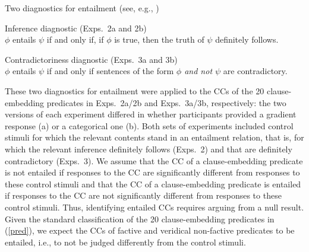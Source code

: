 \documentclass[11pt,fleqn]{article}
\newcommand{\6}{\mbox{$[\hspace*{-.6mm}[$}}
\newcommand{\9}{\mbox{$]\hspace*{-.6mm}]$}}
\begin{document}
\begin{exe}
\ex\label{diag} Two diagnostics for entailment \hfill (see, e.g., \citealt[\S3.1]{ccmg90})
\begin{xlist}
\ex  Inference diagnostic (Exps.~2a and 2b)\\ $\phi$ entails $\psi$ if and only if, if $\phi$ is true, then the truth of $\psi$ definitely follows. 

\ex  Contradictoriness diagnostic  (Exps.~3a and 3b)\\ $\phi$ entails $\psi$ if and only if sentences of the form {\em $\phi$ and not $\psi$} are contradictory. 

\end{xlist}
\end{exe}
These two diagnostics for entailment were applied to the CCs of the 20 clause-embedding predicates in Exps.~2a/2b and Exps.~3a/3b, respectively: the two versions of each experiment differed in whether participants provided a gradient response (a) or a categorical one (b).  Both sets of experiments included control stimuli for which the relevant contents stand in an entailment relation, that is, for which the relevant inference definitely follows (Exps.~2) and that are definitely contradictory (Exps.~3). We assume that the CC of a clause-embedding predicate is not entailed if responses to the CC are significantly different from responses to these control stimuli and that the CC of a clause-embedding predicate is entailed if responses to the CC are not significantly different from responses to these control stimuli. Thus, identifying entailed CCs  requires arguing from a null result. Given the standard classification of the 20 clause-embedding predicates in (\ref{pred}), we expect the CCs of factive and veridical non-factive predicates to be entailed, i.e., to not be judged   differently from the control stimuli.

\end{document}
